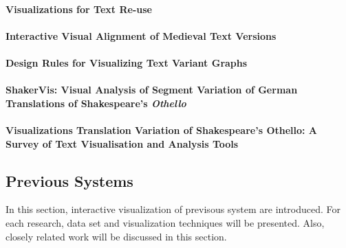 \paragraph{Visualizations for Text Re-use}

\paragraph[]{}

\paragraph{Interactive Visual Alignment of Medieval Text Versions}

\paragraph[]{}

\paragraph{Design Rules for Visualizing Text Variant Graphs}

\paragraph[]{}

\paragraph{ShakerVis: Visual Analysis of Segment Variation of German Translations of Shakespeare’s \emph{Othello}}

\paragraph[]{}

\paragraph{Visualizations Translation Variation of Shakespeare's Othello: A Survey of Text Visualisation and Analysis Tools}

\paragraph[]{}

\subsection{Previous Systems}

In this section, interactive visualization of previsous system are introduced. For each research, data set and visualization techniques will be presented. Also, closely related work will be discussed in this section. 







